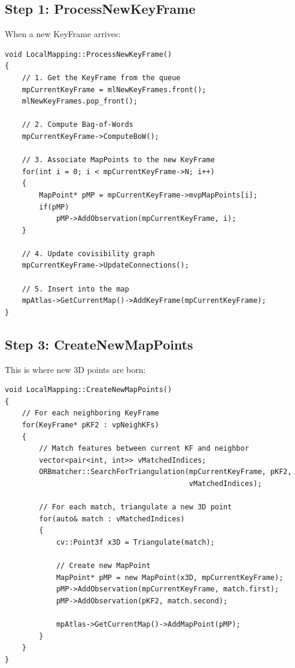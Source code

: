 \subsection{Step 1: ProcessNewKeyFrame}

When a new KeyFrame arrives:

\begin{lstlisting}[caption={ProcessNewKeyFrame}]
void LocalMapping::ProcessNewKeyFrame()
{
    // 1. Get the KeyFrame from the queue
    mpCurrentKeyFrame = mlNewKeyFrames.front();
    mlNewKeyFrames.pop_front();
    
    // 2. Compute Bag-of-Words
    mpCurrentKeyFrame->ComputeBoW();
    
    // 3. Associate MapPoints to the new KeyFrame
    for(int i = 0; i < mpCurrentKeyFrame->N; i++)
    {
        MapPoint* pMP = mpCurrentKeyFrame->mvpMapPoints[i];
        if(pMP)
            pMP->AddObservation(mpCurrentKeyFrame, i);
    }
    
    // 4. Update covisibility graph
    mpCurrentKeyFrame->UpdateConnections();
    
    // 5. Insert into the map
    mpAtlas->GetCurrentMap()->AddKeyFrame(mpCurrentKeyFrame);
}
\end{lstlisting}

\subsection{Step 3: CreateNewMapPoints}

This is where new 3D points are born:

\begin{lstlisting}[caption={CreateNewMapPoints simplified}]
void LocalMapping::CreateNewMapPoints()
{
    // For each neighboring KeyFrame
    for(KeyFrame* pKF2 : vpNeighKFs)
    {
        // Match features between current KF and neighbor
        vector<pair<int, int>> vMatchedIndices;
        ORBmatcher::SearchForTriangulation(mpCurrentKeyFrame, pKF2, 
                                           vMatchedIndices);
        
        // For each match, triangulate a new 3D point
        for(auto& match : vMatchedIndices)
        {
            cv::Point3f x3D = Triangulate(match);
            
            // Create new MapPoint
            MapPoint* pMP = new MapPoint(x3D, mpCurrentKeyFrame);
            pMP->AddObservation(mpCurrentKeyFrame, match.first);
            pMP->AddObservation(pKF2, match.second);
            
            mpAtlas->GetCurrentMap()->AddMapPoint(pMP);
        }
    }
}
\end{lstlisting}

